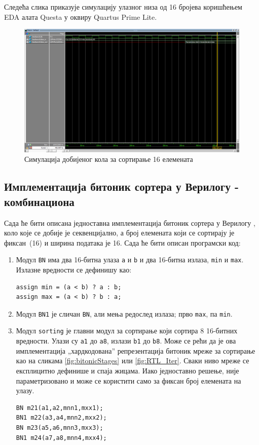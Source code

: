 \documentclass[12pt, a4paper]{article}
\theoremstyle{definition}
\begin{document}
Следећа слика приказује симулацију улазног низа од 16 бројева коришћењем EDA алата Questa у оквиру Quartus Prime Lite.

\begin{figure}[H]
  \centering
      \includegraphics[scale=0.4]{slike/quartusSim.png}
  \caption{Симулација добијеног кола за сортирање 16 елемената}
  \label{fig:quartusSim}
\end{figure}

\newpage
\subsection{Имплементација битоник сортера у Верилогу - комбинациона}
Сада ће бити описана једноставна имплементација битоник сортера у Верилогу \cite{git_verilogProsto}, коло које се добије је секвенцијално, а број елемената који се сортирају је \mbox{фиксан (16)} и ширина података је 16. Сада ће бити описан програмски код:
\begin{enumerate}
 \item Модул \verb+BN+ има два 16-битна улаза \verb+a+ и \verb+b+ и два 16-битна излаза, \verb+min+ и \verb+max+. Излазне вредности се дефинишу као:
 \begin{verbatim}
assign min = (a < b) ? a : b;
assign max = (a < b) ? b : a;
 \end{verbatim}
  \item Модул \verb+BN1+ је сличан \verb+BN+, али мења редослед излаза; прво \verb+max+, па \verb+min+.
\item Модул \verb+sorting+ је главни модул за сортирање који сортира 8 16-битних вредности. Улази су \verb+a1+ до \verb+a8+, излази \verb+b1+ до \verb+b8+. Може се рећи да је ова имплементација „хардкодована” репрезентација битоник мреже за сортирање као на сликама \ref{fig:bitonicStages} или \ref{fig:RTL_Iter}. Сваки ниво мреже се експлицитно дефинише и спаја жицама. Иако једноставно решење, није параметризовано и може се користити само за фиксан број елемената на улазу.
\begin{verbatim}
BN m21(a1,a2,mnn1,mxx1);
BN1 m22(a3,a4,mnn2,mxx2);
BN m23(a5,a6,mnn3,mxx3);
BN1 m24(a7,a8,mnn4,mxx4);
 \end{verbatim}
\end{enumerate}
\end{document}
